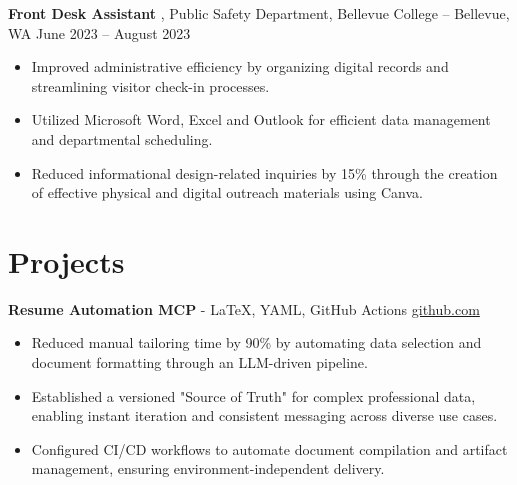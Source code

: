 \documentclass[11pt]{article}       %
\begin{document}
\textbf{Front Desk Assistant} {, Public Safety Department, Bellevue College} -- Bellevue, WA \hfill June 2023 -- August 2023 \\
\vspace{-9pt}
\begin{itemize}
  \item Improved administrative efficiency by organizing digital records and streamlining visitor check-in processes.
  \item Utilized Microsoft Word, Excel and Outlook for efficient data management and departmental scheduling.
  \item Reduced informational design-related inquiries by 15\% through the creation of effective physical and digital outreach materials using Canva.
\end{itemize}

\vspace{-18.5pt}

\section*{Projects}

\textbf{Resume Automation MCP}{ - LaTeX, YAML, GitHub Actions} \hfill \href{https://github.com/Monica20030707/Tex_OrangeLeaf-mcp}{github.com} \\
\vspace{-9pt}
\begin{itemize}
  \item Reduced manual tailoring time by 90\% by automating data selection and document formatting through an LLM-driven pipeline.
  \item Established a versioned "Source of Truth" for complex professional data, enabling instant iteration and consistent messaging across diverse use cases.
  \item Configured CI/CD workflows to automate document compilation and artifact management, ensuring environment-independent delivery.
\end{itemize}

\end{document}
